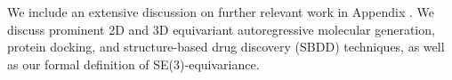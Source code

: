 We include an extensive discussion on further relevant work in Appendix . We discuss prominent 2D and 3D equivariant autoregressive molecular generation, protein docking, and structure-based drug discovery (SBDD) techniques, as well as our formal definition of SE(3)-equivariance.

